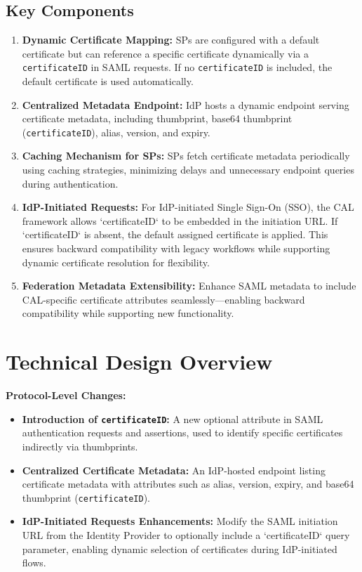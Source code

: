 \documentclass{article}
\begin{document}
\subsection*{Key Components}
\begin{enumerate}
    \item \textbf{Dynamic Certificate Mapping:}
    SPs are configured with a default certificate but can reference a specific certificate dynamically via a \texttt{certificateID} in SAML requests. If no \texttt{certificateID} is included, the default certificate is used automatically.

    \item \textbf{Centralized Metadata Endpoint:}
    IdP hosts a dynamic endpoint serving certificate metadata, including thumbprint, base64 thumbprint (\texttt{certificateID}), alias, version, and expiry.

    \item \textbf{Caching Mechanism for SPs:}
    SPs fetch certificate metadata periodically using caching strategies, minimizing delays and unnecessary endpoint queries during authentication.

    \item \textbf{IdP-Initiated Requests:} 
    For IdP-initiated Single Sign-On (SSO), the CAL framework allows `certificateID` to be embedded in the initiation URL. If `certificateID` is absent, the default assigned certificate is applied. This ensures backward compatibility with legacy workflows while supporting dynamic certificate resolution for flexibility.

    \item \textbf{Federation Metadata Extensibility:}
    Enhance SAML metadata to include CAL-specific certificate attributes seamlessly—enabling backward compatibility while supporting new functionality.
\end{enumerate}

\section*{Technical Design Overview}
\textbf{Protocol-Level Changes:}
\begin{itemize}
    \item \textbf{Introduction of \texttt{certificateID}:} A new optional attribute in SAML authentication requests and assertions, used to identify specific certificates indirectly via thumbprints.
    \item \textbf{Centralized Certificate Metadata:} An IdP-hosted endpoint listing certificate metadata with attributes such as alias, version, expiry, and base64 thumbprint (\texttt{certificateID}).
    \item \textbf{IdP-Initiated Requests Enhancements:} Modify the SAML initiation URL from the Identity Provider to optionally include a `certificateID` query parameter, enabling dynamic selection of certificates during IdP-initiated flows.
\end{itemize}
\end{document}
